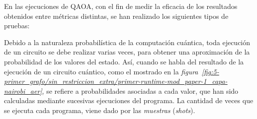 En las ejecuciones de QAOA, con el fin de medir la eficacia de los resultados obtenidos entre métricas distintas, se han realizado los siguientes tipos de pruebas:

Debido a la naturaleza probabilística de la computación cuántica, toda ejecución de un circuito se debe realizar varias veces, para obtener una aproximación de la probabilidad de los valores del estado.
Así, cuando se habla del resultado de la ejecución de un circuito cuántico, como el mostrado en la \textit{figura~\ref{fig:5-primer_grafo/sin_restriccion_extra/primer-runtime-mod_paper-1_capa-nairobi_aer}},
se refiere a probabilidades asociadas a cada valor, que han sido calculadas mediante sucesivas ejecuciones del programa.
La cantidad de veces que se ejecuta cada programa, viene dado por las \textit{muestras} (\textit{shots}).

